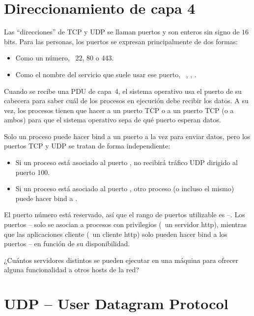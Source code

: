 \section{Direccionamiento de capa 4}\label{sec:layer4:addressing}

Las ``direcciones'' de TCP y UDP se llaman puertos y son enteros sin signo de $16$ bits.
Para las personas, los puertos se expresan principalmente de dos formas:
\begin{itemize}
\item Como un número, \eg\ 22, 80 o 443.
\item Como el nombre del servicio que suele usar ese puerto, \eg\ , , .
\end{itemize}

Cuando se recibe una PDU de capa~4, el sistema operativo usa el puerto de su cabecera para saber cuál de los procesos
en ejecución debe recibir los datos.
A su vez, los procesos tienen que hacer  a un puerto TCP o a un puerto TCP (o a ambos)
para que el sistema operativo sepa de qué puerto esperan datos.

Solo un proceso puede hacer bind a un puerto a la vez para enviar datos, pero los puertos TCP y UDP
se tratan de forma independiente:
\begin{itemize}
 \item Si un proceso está asociado al puerto , no recibirá tráfico UDP dirigido al puerto 100.
 \item Si un proceso está asociado al puerto , otro proceso (o incluso el mismo) puede
   hacer bind a .  
\end{itemize}

El puerto número  está reservado, así que el rango de puertos utilizable es \mbox{--}.
Los puertos -- solo se asocian a
procesos con privilegios (\eg\ un servidor http), mientras que las aplicaciones cliente (\eg\ un cliente http)
solo pueden hacer bind a los puertos -- en función de su disponibilidad.

\begin{exercise}
¿Cuántos servidores distintos se pueden ejecutar en una máquina para ofrecer alguna funcionalidad a otros hosts de la red?
\end{exercise}


\section{UDP -- User Datagram Protocol}\label{sec:layer4:udp}
